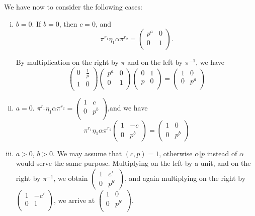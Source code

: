 We have now to consider the following cases:

\begin{enumerate}[(i)]
\item  $ b = 0 $. If $ b = 0 $, then $ c = 0 $, and 
  $$
  \pi^{r_1} \eta_1 \alpha \pi^{r_2} = \begin{pmatrix} p^a &  0 \\ 0 &
    1 \\ \end{pmatrix}.  
  $$

  By multiplication on the right by $ \pi $ and on the left by $
  \pi^{-1} $, we have  
  $$
  \begin{pmatrix} 0 &  \frac{1}{p} \\ 1 & 0
    \\ \end{pmatrix} \begin{pmatrix} p^a &  0 \\ 0 & 1
    \\ \end{pmatrix} \begin{pmatrix} 0 &  1 \\ p & 0 \\ \end{pmatrix}
  = \begin{pmatrix} 1 &  0 \\ 0 & p^a \\ \end{pmatrix} 
  $$
\item ${a = 0} $. $ \pi^{r_1} \eta_1 \alpha \pi^{r_2}
  =  \begin{pmatrix} 1 &  c \\ 0 & p^b  \\ \end{pmatrix} $,\pageoriginale and we
  have  
  $$
  \pi^{r_1} \eta_1 \alpha \pi^{r_2} 
  \begin{pmatrix} 1 &  -c \\ 0 & p^b  \end{pmatrix} = 
  \begin{pmatrix} 1 &  0 \\ 0 & p^b \end{pmatrix} 
  $$
\item $ {a > 0} $, ${ b > 0} $. We may assume that  $ (c,p) = 1 $,
  otherwise  $ \alpha |p $ instead of $ \alpha $ would serve the
  same purpose. Multiplying on the left by a unit, and on the right by
  $ \pi^{-1} $, we obtain $ \begin{pmatrix} 1 &  c' \\ 0 &
    p^{b'}  \end{pmatrix} $, and again multiplying on the right by
  $ \begin{pmatrix} 1 &  -c' \\ 0 & 1 \\ \end{pmatrix} $, we arrive at
  $ \begin{pmatrix} 1 &  0 \\ 0 & p^{b'} \\ \end{pmatrix} $. 
\end{enumerate}

